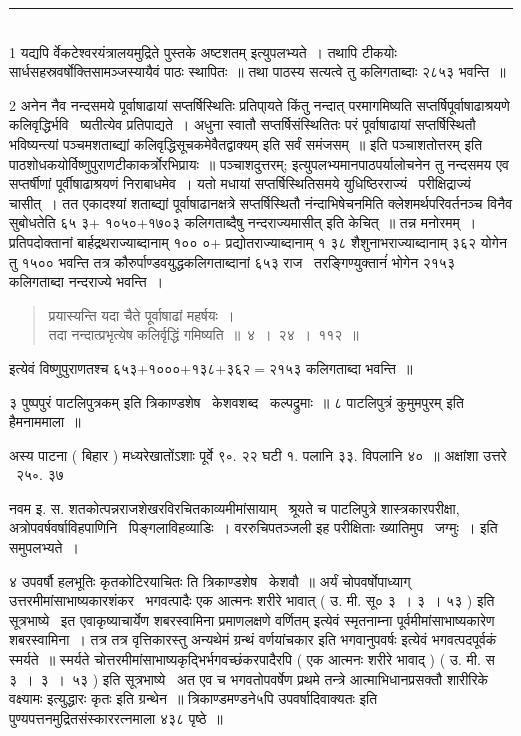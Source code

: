 \documentclass[11pt, openany]{book}
\begin{document}
\begin{multicols}{2}
\noindent
\rule{1\linewidth}{0.5pt}\\

1 यद्यपि र्वेकटेश्वरयंत्रालयमुद्रिते पुस्तके {\qt अष्टशतम्} इत्युपलभ्यते~। तथापि टीकयोः सार्धसहस्रवर्षोक्तिसामञ्जस्यायैवं पाठः स्थापितः~॥ तथा पाठस्य सत्यत्वे तु कलिगताब्दाः २८५३ भवन्ति~॥

2 अनेन नैव नन्दसमये पूर्वाषाढायां सप्तर्षिस्थितिः प्रतिपा्यते किंतु नन्दात् परमागमिष्यति सप्तर्षिपूर्वाषाढाश्रयणे कलिवृद्धिर्भवि \textendash\ ष्यतीत्येव प्रतिपाद्यते~। अधुना स्वातौ सप्तर्षिसंस्थितितः परं पूर्वाषाढायां सप्तर्षिस्थितौ भविष्यन्त्यां पञ्चमशताब्द्यां कलिवृद्धिसूचकमेवैतद्वाक्यम् इति सर्वं समंजसम्~॥ इति पञ्चाशतोत्तरम् इति पाठशोधकयोर्विष्णुपुराणटीकाकर्त्रोरभिप्रायः~॥ {\qt पञ्चाशदुत्तरम्}; इत्युपलभ्यमानपाठपर्यालोचनेन तु नन्दसमय एव सप्तर्षीणां पूर्वीषाढाश्रयणं निराबाधमेव~। यतो मधायां सप्तर्षिस्थितिसमये युधिष्ठिरराज्यं \textendash\ परीक्षिद्राज्यं चासीत्~। तत एकादश्यां शताब्द्यां पूर्वाषाढानक्षत्रे सप्तर्षिस्थितौ नंन्दाभिषेचनमिति क्लेशमर्थपरिवर्तनञ्च विनैव सुबोधतेति ६५ ३+ १०५०+१७०३ कलिगताब्दैषु नन्दराज्यमासीत् इति केचित्~॥ तन्न मनोरमम्~। प्रतिपदोक्तानां बार्हद्रथराज्याब्दानाम् १०० ०+ प्रद्योतराज्याब्दानाम् १ ३८ शैशुनाभराज्याब्दानाम् ३६२ योगेन तु १५०० भवन्ति तत्र कौरुर्पाण्डवयुद्धकलिगताब्दानां ६५३ राज \textendash\ तरङ्गिण्युक्तानंं भोगेन २१५३ कलिगताब्दा नन्दराज्ये भवन्ति~।

\columnbreak

\begin{quote}
{\mbh प्रयास्यन्ति यदा चैते पूर्वाषाढां महर्षयः~।\\
तदा नन्दात्प्रभृत्येष कलिर्वृद्धिं गमिष्यति~॥~४~।~२४~।~११२~॥}
\end{quote}

इत्येवं विष्णुपुराणतश्च ६५३+१०००+१३८+३६२$=$२१५३ कलिगताब्दा भवन्ति~॥

३ पुष्पपुरं पाटलिपुत्रकम् इति त्रिकाण्डशेष \textendash\ केशवशब्द \textendash\ कल्पद्रुमाः~॥ ८ {\qt पाटलिपुत्रं कुमुमपुरम्} इति हैमनाममाला~॥

अस्य पाटना ( बिहार ) मध्यरेखातोंऽशाः पूर्वे ९∘. २२ घटी १. पलानि ३३. विपलानि ४०~॥ अक्षांशा उत्तरे \textendash\ २५∘. ३७

नवम इ. स. शतकोत्पन्नराजशेखरविरचितकाव्यमीमांसायाम् \textendash\ {\qt श्रूयते च पाटलिपुत्रे शास्त्रकारपरीक्षा, अत्रोपवर्षवर्षाविहपाणिनि \textendash\ पिङ्गलाविहव्याडिः~। वररुचिपतञ्जली इह परीक्षिताः ख्यातिमुप \textendash\ जग्मुः~।} इति समुपलभ्यते~। 

४ {\qt उपवर्षौ हलभूतिः कृतकोटिरयाचितः} ति त्रिकाण्डशेष \textendash\ केशवौ~॥ अर्यं चोपवर्षोपाध्याग् उत्तरमीमांसाभाष्यकारशंकर \textendash\ भगवत्पादैः {\qt एक आत्मनः शरीरे भावात्} ( उ. मी. सू० ३~। ३~। ५३ ) इति सूत्रभाष्ये \textendash\ {\qt इत एवाकृष्याचार्येण शबरस्वामिना प्रमाणलक्षणे वर्णितम्} इत्येवं स्मृतनाम्ना पूर्वमीमांसाभाष्यकारेण शबरस्वामिना~। तत्र तत्र {\qt वृत्तिकारस्तु अन्यथेमं ग्रन्थं वर्णयांचकार इति भगवानुपवर्षः} इत्येवं भगवत्पदपूर्वकं स्मर्यते~॥ स्मर्यते चोत्तरमीमांसाभाष्यकृद्भिर्भगवच्छंकरपादैरपि ( {\qt एक आत्मनः शरीरे भावाद्} ) ( उ. मी. स ३~।~३~।~५३ ) इति सूत्रभाष्ये \textendash\ अत एव च भगवतोपवर्षेण प्रथमे तन्त्रे आत्माभिधानप्रसक्तौ {\qt शारीरिके वक्ष्यामः इत्युद्धारः कृतः} इति ग्रन्थेन~॥ त्रिकाण्डमण्डने५पि {\qt उपवर्षादिवाक्यतः} इति पुण्यपत्तनमुद्रितसंस्काररत्नमाला ४३८ पृष्ठे~॥


\end{multicols}
\end{document}
